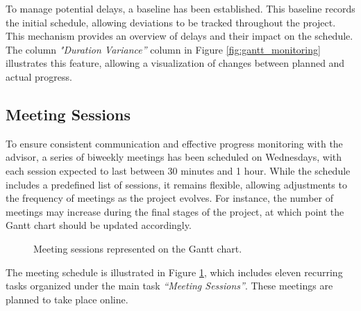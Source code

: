 To manage potential delays, a baseline has been established. This baseline records the initial schedule, allowing deviations to be tracked throughout the project. This mechanism provides an overview of delays and their impact on the schedule. The column \textit{"Duration Variance”} column in Figure \ref{fig:gantt_monitoring} illustrates this feature, allowing a visualization of changes between planned and actual progress.

\subsection{Meeting Sessions}

To ensure consistent communication and effective progress monitoring with the advisor, a series of biweekly meetings has been scheduled on Wednesdays, with each session expected to last between 30 minutes and 1 hour. While the schedule includes a predefined list of sessions, it remains flexible, allowing adjustments to the frequency of meetings as the project evolves. For instance, the number of meetings may increase during the final stages of the project, at which point the Gantt chart should be updated accordingly.

\begin{figure}
      \centering
      \caption{Meeting sessions represented on the Gantt chart.}
      \label{fig:gantt_meetings}
\end{figure}

The meeting schedule is illustrated in Figure \ref{fig:gantt_meetings}, which includes eleven recurring tasks organized under the main task \textit{“Meeting Sessions”}. These meetings are planned to take place online.

